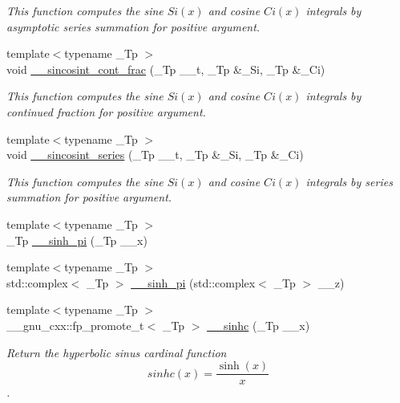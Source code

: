 \begin{DoxyCompactItemize}
\begin{DoxyCompactList}\small\item\em This function computes the sine $ Si(x) $ and cosine $ Ci(x) $ integrals by asymptotic series summation for positive argument. \end{DoxyCompactList}\item 
{\footnotesize template$<$typename \+\_\+\+Tp $>$ }\\void \hyperlink{namespacestd_1_1____detail_a211f552bca2944f64e3a1f5593690fda}{\+\_\+\+\_\+sincosint\+\_\+cont\+\_\+frac} (\+\_\+\+Tp \+\_\+\+\_\+t, \+\_\+\+Tp \&\+\_\+\+Si, \+\_\+\+Tp \&\+\_\+\+Ci)
\begin{DoxyCompactList}\small\item\em This function computes the sine $ Si(x) $ and cosine $ Ci(x) $ integrals by continued fraction for positive argument. \end{DoxyCompactList}\item 
{\footnotesize template$<$typename \+\_\+\+Tp $>$ }\\void \hyperlink{namespacestd_1_1____detail_aea85e0044476065ed4a067f1aa9647cb}{\+\_\+\+\_\+sincosint\+\_\+series} (\+\_\+\+Tp \+\_\+\+\_\+t, \+\_\+\+Tp \&\+\_\+\+Si, \+\_\+\+Tp \&\+\_\+\+Ci)
\begin{DoxyCompactList}\small\item\em This function computes the sine $ Si(x) $ and cosine $ Ci(x) $ integrals by series summation for positive argument. \end{DoxyCompactList}\item 
{\footnotesize template$<$typename \+\_\+\+Tp $>$ }\\\+\_\+\+Tp \hyperlink{namespacestd_1_1____detail_a6dd7153012cc7885e76a47a5162981da}{\+\_\+\+\_\+sinh\+\_\+pi} (\+\_\+\+Tp \+\_\+\+\_\+x)
\item 
{\footnotesize template$<$typename \+\_\+\+Tp $>$ }\\std\+::complex$<$ \+\_\+\+Tp $>$ \hyperlink{namespacestd_1_1____detail_aa8fe06b3d9584ea9c81b0349ba7eb2dc}{\+\_\+\+\_\+sinh\+\_\+pi} (std\+::complex$<$ \+\_\+\+Tp $>$ \+\_\+\+\_\+z)
\item 
{\footnotesize template$<$typename \+\_\+\+Tp $>$ }\\\+\_\+\+\_\+gnu\+\_\+cxx\+::fp\+\_\+promote\+\_\+t$<$ \+\_\+\+Tp $>$ \hyperlink{namespacestd_1_1____detail_a65db661ebfae979e916e2f4481e6866c}{\+\_\+\+\_\+sinhc} (\+\_\+\+Tp \+\_\+\+\_\+x)
\begin{DoxyCompactList}\small\item\em Return the hyperbolic sinus cardinal function \[ sinhc(x) = \frac{\sinh(x)}{x} \]. \end{DoxyCompactList}\item 

\end{DoxyCompactItemize}
